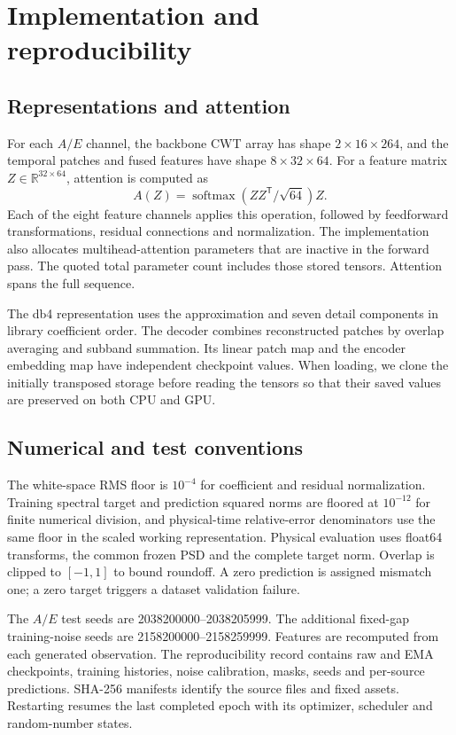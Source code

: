 \documentclass[10pt,prd,aps,a4paper,twocolumn,superscriptaddress,nofootinbib,floatfix]{revtex4-2}
\begin{document}
\section{Implementation and reproducibility}\label{app:model_analysis}
\subsection{Representations and attention}
For each $A/E$ channel, the backbone CWT array has shape $2\times16\times264$, and the temporal patches and fused features have shape $8\times32\times64$. For a feature matrix $Z\in\mathbb R^{32\times64}$, attention is computed as
\begin{equation}
A(Z)=\operatorname{softmax}(ZZ^{\mathsf T}/\sqrt{64})Z.
\end{equation}
Each of the eight feature channels applies this operation, followed by feedforward transformations, residual connections and normalization. The implementation also allocates multihead-attention parameters that are inactive in the forward pass. The quoted total parameter count includes those stored tensors. Attention spans the full sequence.

The db4 representation uses the approximation and seven detail components in library coefficient order. The decoder combines reconstructed patches by overlap averaging and subband summation. Its linear patch map and the encoder embedding map have independent checkpoint values. When loading, we clone the initially transposed storage before reading the tensors so that their saved values are preserved on both CPU and GPU.

\subsection{Numerical and test conventions}
The white-space RMS floor is $10^{-4}$ for coefficient and residual normalization. Training spectral target and prediction squared norms are floored at $10^{-12}$ for finite numerical division, and physical-time relative-error denominators use the same floor in the scaled working representation. Physical evaluation uses float64 transforms, the common frozen PSD and the complete target norm. Overlap is clipped to $[-1,1]$ to bound roundoff. A zero prediction is assigned mismatch one; a zero target triggers a dataset validation failure.

The $A/E$ test seeds are 2038200000--2038205999. The additional fixed-gap training-noise seeds are 2158200000--2158259999. Features are recomputed from each generated observation. The reproducibility record contains raw and EMA checkpoints, training histories, noise calibration, masks, seeds and per-source predictions. SHA-256 manifests identify the source files and fixed assets. Restarting resumes the last completed epoch with its optimizer, scheduler and random-number states.
\end{document}
